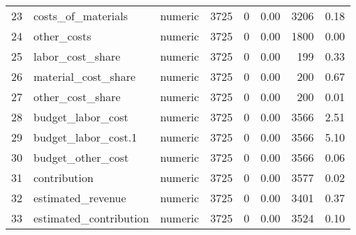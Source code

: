 \begin{sidewaystable}[ht]
\begin{tabular}{rllrrrrr}
  23 & costs\_of\_materials & numeric & 3725 &   0 & 0.00 & 3206 & 0.18 \\ 
  24 & other\_costs & numeric & 3725 &   0 & 0.00 & 1800 & 0.00 \\ 
  25 & labor\_cost\_share & numeric & 3725 &   0 & 0.00 & 199 & 0.33 \\ 
  26 & material\_cost\_share & numeric & 3725 &   0 & 0.00 & 200 & 0.67 \\ 
  27 & other\_cost\_share & numeric & 3725 &   0 & 0.00 & 200 & 0.01 \\ 
  28 & budget\_labor\_cost & numeric & 3725 &   0 & 0.00 & 3566 & 2.51 \\ 
  29 & budget\_labor\_cost.1 & numeric & 3725 &   0 & 0.00 & 3566 & 5.10 \\ 
  30 & budget\_other\_cost & numeric & 3725 &   0 & 0.00 & 3566 & 0.06 \\ 
  31 & contribution & numeric & 3725 &   0 & 0.00 & 3577 & 0.02 \\ 
  32 & estimated\_revenue & numeric & 3725 &   0 & 0.00 & 3401 & 0.37 \\ 
  33 & estimated\_contribution & numeric & 3725 &   0 & 0.00 & 3524 & 0.10 \\ 
   \hline
\end{tabular}
\end{sidewaystable}
